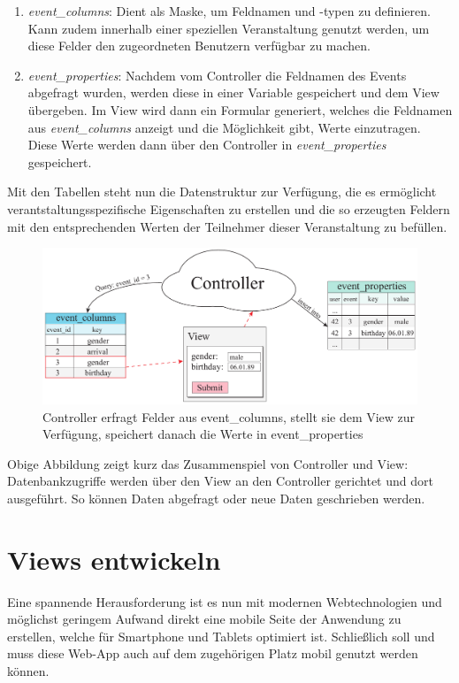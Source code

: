 \begin{enumerate} 
	\item \emph{event\_columns}: Dient als Maske, um Feldnamen und -typen zu definieren. Kann zudem innerhalb einer speziellen Veranstaltung genutzt werden, um diese Felder den zugeordneten Benutzern verfügbar zu machen.
	\item \emph{event\_properties}: Nachdem vom Controller die Feldnamen des Events abgefragt wurden, werden diese in einer Variable gespeichert und dem View übergeben. Im View wird dann ein Formular generiert, welches die Feldnamen aus \emph{event\_columns} anzeigt und die Möglichkeit gibt, Werte einzutragen. Diese Werte werden dann über den Controller in \emph{event\_properties} gespeichert.
\end{enumerate}

Mit den Tabellen steht nun die Datenstruktur zur Verfügung, die es ermöglicht verantstaltungsspezifische Eigenschaften zu erstellen und die so erzeugten Feldern mit den entsprechenden Werten der Teilnehmer dieser Veranstaltung zu befüllen.

\begin{figure}[!ht]
	\centering
	\includegraphics[width=15cm]{fig/event_properties}
	\caption[Speichern von spez. Feldern in die Datenbank]{Controller erfragt Felder aus event\_columns, stellt sie dem View zur Verfügung, speichert danach die Werte in event\_properties}
\end{figure}

Obige Abbildung zeigt kurz das Zusammenspiel von Controller und View: Datenbankzugriffe werden über den View an den Controller gerichtet und dort ausgeführt. So können Daten abgefragt oder neue Daten geschrieben werden.

\section{Views entwickeln}
Eine spannende Herausforderung ist es nun mit modernen Webtechnologien und möglichst geringem Aufwand direkt eine mobile Seite der Anwendung zu erstellen, welche für Smartphone und Tablets optimiert ist. Schließlich soll und muss diese Web-App auch auf dem zugehörigen Platz mobil genutzt werden können.\par

